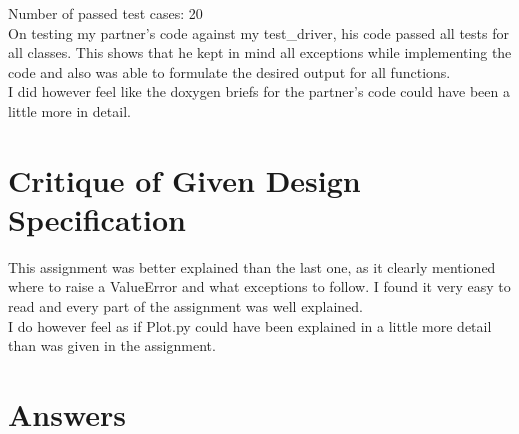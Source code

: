 \documentclass[12pt]{article}
\begin{document}
\noindent Number of passed test cases: 20\\

\noindent On testing my partner's code against my test\_driver, his code passed all tests for all classes. This shows that he kept in mind all exceptions while implementing the code and also was able to formulate the desired output for all functions.\\

\noindent I did however feel like the doxygen briefs for the partner's code could have been a little more in detail.

\section{Critique of Given Design Specification}

This assignment was better explained than the last one, as it clearly mentioned where to raise a ValueError and what exceptions to follow. I found it very easy to read and every part of the assignment was well explained.\\

\noindent I do however feel as if Plot.py could have been explained in a little more detail than was given in the assignment.

\section{Answers}
\end{document}
